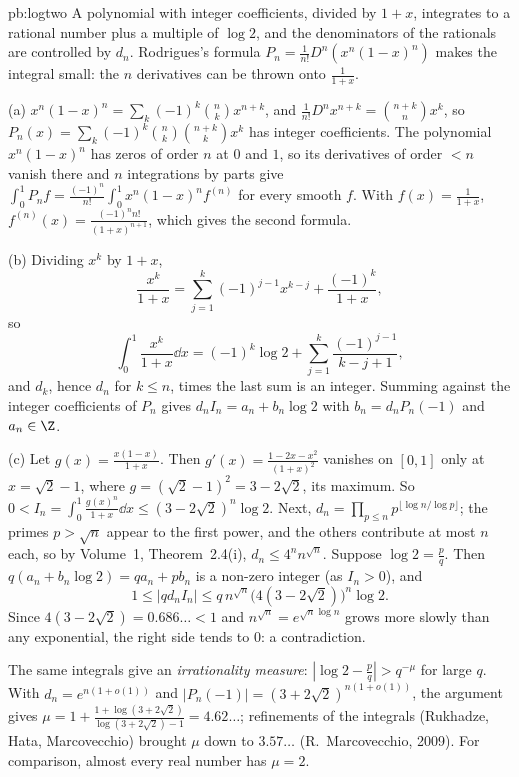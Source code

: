 \begin{solution}{pb:logtwo}
\idea A polynomial with integer coefficients, divided by $1+x$, integrates to a rational number plus a multiple of $\log2$, and
the denominators of the rationals are controlled by $d_n$. Rodrigues's formula $P_n=\frac1{n!}D^n(x^n(1-x)^n)$ makes the integral small:
the $n$ derivatives can be thrown onto $\frac1{1+x}$.

\writeup (a) $x^n(1-x)^n=\sum_k(-1)^k\binom nkx^{n+k}$, and $\frac1{n!}D^nx^{n+k}=\binom{n+k}nx^k$, so $P_n(x)=\sum_k(-1)^k\binom nk\binom{n+k}kx^k$ has integer
coefficients. The polynomial $x^n(1-x)^n$ has zeros of order $n$ at $0$ and $1$, so its derivatives of order $<n$ vanish there and $n$
integrations by parts give $\int_0^1P_nf=\frac{(-1)^n}{n!}\int_0^1x^n(1-x)^nf^{(n)}$ for every smooth $f$. With $f(x)=\frac1{1+x}$,
$f^{(n)}(x)=\frac{(-1)^nn!}{(1+x)^{n+1}}$, which gives the second formula.

(b) Dividing $x^k$ by $1+x$,
\[
\frac{x^k}{1+x}=\sum_{j=1}^k(-1)^{j-1}x^{k-j}+\frac{(-1)^k}{1+x},
\]
so
\[
\int_0^1\frac{x^k}{1+x}\dd x=(-1)^k\log2+\sum_{j=1}^k\frac{(-1)^{j-1}}{k-j+1},
\]
and $d_k$, hence $d_n$ for $k\le n$, times the last sum is an integer. Summing against the integer coefficients of $P_n$ gives
$d_nI_n=a_n+b_n\log2$ with $b_n=d_nP_n(-1)$ and $a_n\in\Z$.

(c) Let $g(x)=\frac{x(1-x)}{1+x}$. Then $g'(x)=\frac{1-2x-x^2}{(1+x)^2}$ vanishes on $[0,1]$ only at $x=\sqrt2-1$, where $g=(\sqrt2-1)^2=3-2\sqrt2$, its
maximum. So $0<I_n=\int_0^1\frac{g(x)^n}{1+x}\dd x\le(3-2\sqrt2)^n\log2$. Next, $d_n=\prod_{p\le n}p^{\lfloor\log n/\log p\rfloor}$; the primes $p>\sqrt n$ appear
to the first power, and the others contribute at most $n$ each, so by Volume~1, Theorem~2.4(i), $d_n\le4^nn^{\sqrt n}$. Suppose
$\log2=\frac pq$. Then $q(a_n+b_n\log2)=qa_n+pb_n$ is a non-zero integer (as $I_n>0$), and
\[
1\le|qd_nI_n|\le q\,n^{\sqrt n}\bigl(4(3-2\sqrt2)\bigr)^n\log2.
\]
Since $4(3-2\sqrt2)=0.686\ldots<1$ and $n^{\sqrt n}=e^{\sqrt n\log n}$ grows more slowly than any exponential, the right side tends to $0$:
a contradiction.

\leads The same integrals give an \emph{irrationality measure}: $|\log2-\frac pq|>q^{-\mu}$ for large $q$. With $d_n=e^{n(1+o(1))}$ and
$|P_n(-1)|=(3+2\sqrt2)^{n(1+o(1))}$, the argument gives $\mu=1+\frac{1+\log(3+2\sqrt2)}{\log(3+2\sqrt2)-1}=4.62\ldots$; refinements of the integrals (Rukhadze, Hata, Marcovecchio) brought $\mu$ down to $3.57\ldots$ (R.~Marcovecchio,
2009). For comparison, almost every real number has $\mu=2$.
\end{solution}

